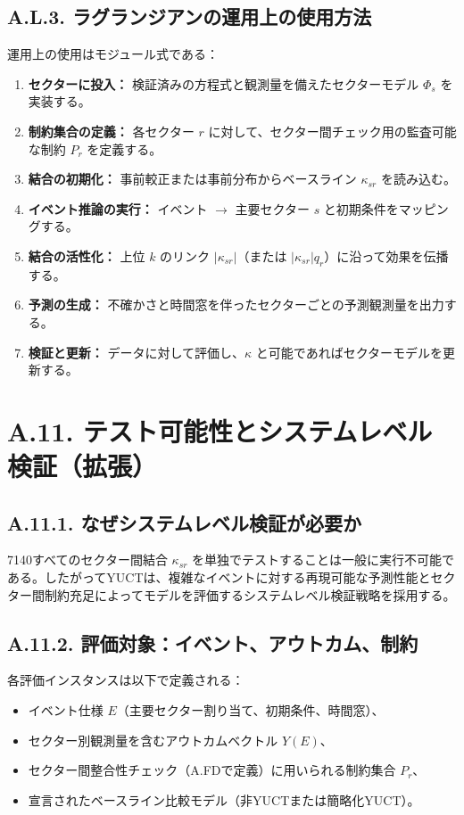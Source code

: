 \documentclass[13pt,a4paper]{ltjsarticle}
\begin{document}
	\subsection*{A.L.3. ラグランジアンの運用上の使用方法}
	運用上の使用はモジュール式である：
	\begin{enumerate}[leftmargin=*]
		\item \textbf{セクターに投入：} 検証済みの方程式と観測量を備えたセクターモデル $\Phi_s$ を実装する。
		\item \textbf{制約集合の定義：} 各セクター $r$ に対して、セクター間チェック用の監査可能な制約 $P_r$ を定義する。
		\item \textbf{結合の初期化：} 事前較正または事前分布からベースライン $\kappa_{sr}$ を読み込む。
		\item \textbf{イベント推論の実行：} イベント $\to$ 主要セクター $s$ と初期条件をマッピングする。
		\item \textbf{結合の活性化：} 上位 $k$ のリンク $|\kappa_{sr}|$（または $|\kappa_{sr}|q_r$）に沿って効果を伝播する。
		\item \textbf{予測の生成：} 不確かさと時間窓を伴ったセクターごとの予測観測量を出力する。
		\item \textbf{検証と更新：} データに対して評価し、$\kappa$ と可能であればセクターモデルを更新する。
	\end{enumerate}
	
	\section*{A.11. テスト可能性とシステムレベル検証（拡張）}
	\label{sec:extended-testability}
	
	\subsection*{A.11.1. なぜシステムレベル検証が必要か}
	7140すべてのセクター間結合 $\kappa_{sr}$ を単独でテストすることは一般に実行不可能である。したがってYUCTは、複雑なイベントに対する再現可能な予測性能とセクター間制約充足によってモデルを評価するシステムレベル検証戦略を採用する。
	
	\subsection*{A.11.2. 評価対象：イベント、アウトカム、制約}
	各評価インスタンスは以下で定義される：
	\begin{itemize}[leftmargin=*]
		\item イベント仕様 $E$（主要セクター割り当て、初期条件、時間窓）、
		\item セクター別観測量を含むアウトカムベクトル $Y(E)$、
		\item セクター間整合性チェック（A.FDで定義）に用いられる制約集合 $P_r$、
		\item 宣言されたベースライン比較モデル（非YUCTまたは簡略化YUCT）。
	\end{itemize}
	
\end{document}
